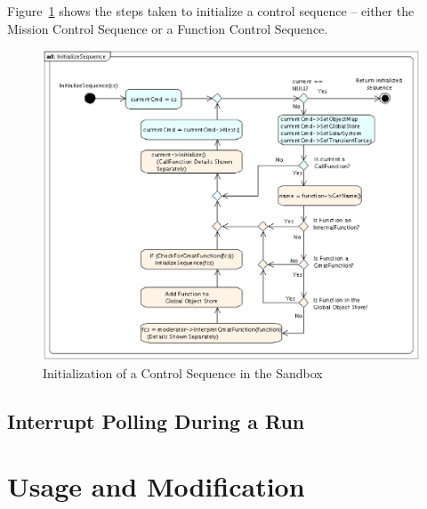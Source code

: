 Figure~\ref{figure:SequenceInit} shows the steps taken to initialize a control sequence -- either
the Mission Control Sequence or a Function Control Sequence.

\begin{figure}[htb]
\begin{center}
\includegraphics[scale=0.5]{Images/InitializeSequence.eps}
\caption{\label{figure:SequenceInit}Initialization of a Control Sequence in the Sandbox}
\end{center}
\end{figure}

\subsection{\label{section:SandboxInterruptPolling}Interrupt Polling During a Run}

\section{Usage and Modification}

